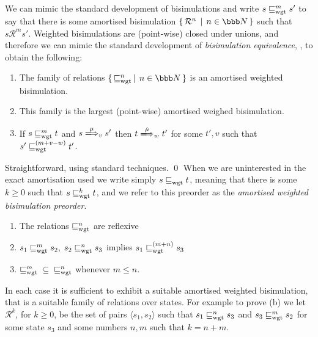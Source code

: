 \documentclass{LMCS}
\newcommand{\nats}{\ensuremath{\bbb N}\xspace}
\newcommand{\amort}[1]{\mathrel{\sqsubseteq_{\rm wgt}^{#1}}}
\def\pair(#1,#2){\langle #1 , #2 \rangle}\newcommand{\parrow}{ \mathbin{\rightharpoonup}}
\newcommand{\setof}[2]{\{ \, #1 \, \mid \, #2 \, \}}\newcommand{\sset}[1]{\{ {#1}  \}  }
\newcommand{\calR}{\mathbin{\mathcal{R}}}
\newcommand{\dar}[1]{\xLongrightarrow{\vspace{-2em}#1}}
\begin{document}
We can mimic the standard development of bisimulations and
write $s \amort{m} s'$ to say that there is some amortised
bisimulation $\setof{ \calR^n}{ n \in \nats}$ such that $ s \calR^m s'$.
Weighted bisimulations are (point-wise) closed under unions, and therefore we can
mimic the standard development of \emph{bisimulation equivalence}, \cite{ccs},
to obtain the following:
\begin{prop}\label{prop:amort.prop}\hfill
  \begin{enumerate}[\em(a)]
  \item The family of relations $\setof{ \amort{n}}{ n \in \nats}$ is an 
amortised  weighted bisimulation.
  \item This family is the largest (point-wise) amortised weighed bisimulation.
  \item If $s \amort{m} t$ and $s \dar{\mu}_v s'$ then $t \dar{\hat{\mu}}_w t'$ for some
        $t', v$ such that $s' \amort{(m+v-w)} t'$.
  \end{enumerate}
\end{prop}
\proof
Straightforward, using standard techniques.
\qed
When we are uninterested in the exact amortisation used we write simply
$s \amort{} t$, meaning that there is some $k \geq 0$ such that $s \amort{k} t$,
and we refer to this preorder as the \emph{amortised weighted bisimulation preorder}.
\begin{prop}\hfill
  \begin{enumerate}[\em(a)]
  \item  The relations $\amort{n}$ are reflexive 
  \item $s_1 \amort{m} s_2,\; s_2 \amort{n} s_3$ implies $s_1 \amort{(m+n)} s_3$
  \item $ \amort{m} \;\;\subseteq\;\; \amort{n}$ whenever  $m \leq n$. 
  \end{enumerate}
\end{prop}
\proof
In each case it is sufficient to exhibit a suitable amortised weighted bisimulation, that
is a suitable family of relations over states. For example to prove (b) we let
$\calR^k$, for $k \geq 0$, be the set of pairs $\pair(s_1,s_2)$ such that
$s_1 \amort{n} s_3$ and $s_3 \amort{m} s_2$
for some state $s_3$ and some numbers $n,m$ such that $k = n+m$. 
\end{document}
